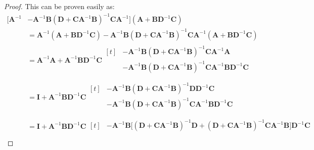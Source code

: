 \begin{proof}
    This can be proven easily as:
    \begin{equation*}
    \begin{aligned}
        \Big[\boldsymbol A^{-1}&-\boldsymbol A^{-1}\boldsymbol B(\boldsymbol D+\boldsymbol C\boldsymbol A^{-1}\boldsymbol B)^{-1}\boldsymbol C\boldsymbol A^{-1}\Big](\boldsymbol A+\boldsymbol B\boldsymbol D^{-1}\boldsymbol C) \\
        &= \boldsymbol A^{-1} (\boldsymbol A+\boldsymbol B\boldsymbol D^{-1}\boldsymbol C) -\boldsymbol A^{-1}\boldsymbol B(\boldsymbol D+\boldsymbol C\boldsymbol A^{-1}\boldsymbol B)^{-1}\boldsymbol C\boldsymbol A^{-1} (\boldsymbol A+\boldsymbol B\boldsymbol D^{-1}\boldsymbol C) \\
        &= \boldsymbol A^{-1}\boldsymbol A+\boldsymbol A^{-1}\boldsymbol B\boldsymbol D^{-1}\boldsymbol C \begin{aligned}[t]  
            &- \boldsymbol A^{-1}\boldsymbol B(\boldsymbol D+\boldsymbol C\boldsymbol A^{-1}\boldsymbol B)^{-1}\boldsymbol C\boldsymbol A^{-1}\boldsymbol A \\
            &-\boldsymbol A^{-1}\boldsymbol B(\boldsymbol D+\boldsymbol C\boldsymbol A^{-1}\boldsymbol B)^{-1}\boldsymbol C\boldsymbol A^{-1}\boldsymbol B\boldsymbol D^{-1}\boldsymbol C \\
        \end{aligned} \\
        &= \boldsymbol I + \boldsymbol A^{-1}\boldsymbol B\boldsymbol D^{-1}\boldsymbol C \begin{aligned}[t] 
            &- \boldsymbol A^{-1}\boldsymbol B(\boldsymbol D+\boldsymbol C\boldsymbol A^{-1}\boldsymbol B)^{-1}\boldsymbol D\boldsymbol D^{-1}\boldsymbol C \\
            &-\boldsymbol A^{-1}\boldsymbol B(\boldsymbol D+\boldsymbol C\boldsymbol A^{-1}\boldsymbol B)^{-1}\boldsymbol C\boldsymbol A^{-1}\boldsymbol B\boldsymbol D^{-1}\boldsymbol C \\
        \end{aligned} \\
        &= \boldsymbol I + \boldsymbol A^{-1}\boldsymbol B\boldsymbol D^{-1}\boldsymbol C \begin{aligned}[t] 
            &-\boldsymbol A^{-1}\boldsymbol B\Big[(\boldsymbol D+\boldsymbol C\boldsymbol A^{-1}\boldsymbol B)^{-1}\boldsymbol D +(\boldsymbol D+\boldsymbol C\boldsymbol A^{-1}\boldsymbol B)^{-1}\boldsymbol C\boldsymbol A^{-1}\boldsymbol B \Big]\boldsymbol D^{-1}\boldsymbol C\\

\end{aligned}
\end{aligned}
\end{equation*}
\end{proof}
